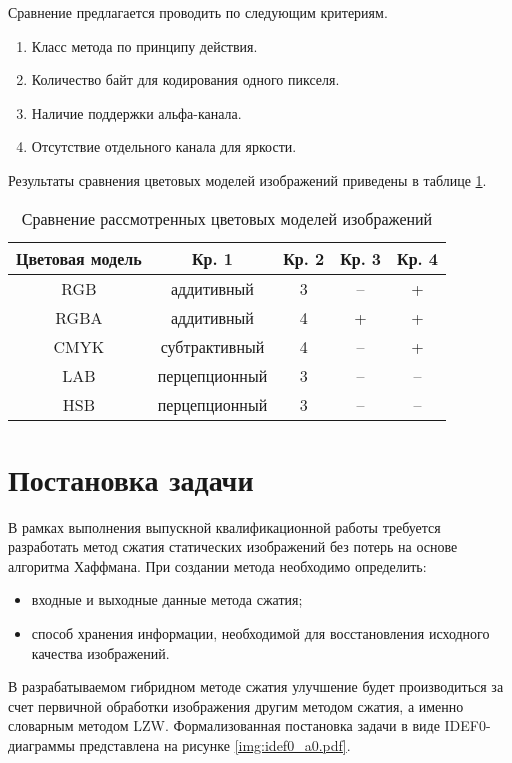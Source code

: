 Сравнение предлагается проводить по следующим критериям.
\begin{enumerate}
    \item Класс метода по принципу действия.
    \item Количество байт для кодирования одного пикселя.
    \item Наличие поддержки альфа-канала.
    \item Отсутствие отдельного канала для яркости.
\end{enumerate}

Результаты сравнения цветовых моделей изображений приведены в таблице \ref{tbl:color_models}.
\captionsetup{justification=raggedleft,singlelinecheck=false}
\begin{table}[H]
    \centering
	\caption{Сравнение рассмотренных цветовых моделей изображений}
    \label{tbl:color_models}
	\begin{tabular}{|c|c|c|c|c|}
        \hline
        \textbf{Цветовая модель} & \textbf{Кр. 1} & \textbf{Кр. 2} & \textbf{Кр. 3} & \textbf{Кр. 4} \\ \hline
        RGB   & аддитивный    & 3 & -- & +  \\ \hline
        RGBA  & аддитивный    & 4 & +  & +  \\ \hline
        CMYK  & субтрактивный & 4 & -- & +  \\ \hline
        LAB   & перцепционный & 3 & -- & -- \\ \hline
        HSB   & перцепционный & 3 & -- & -- \\ \hline
    \end{tabular}
\end{table}

\section{Постановка задачи}

В рамках выполнения выпускной квалификационной работы требуется разработать метод сжатия статических изображений без потерь на основе алгоритма Хаффмана. При создании метода необходимо определить:
\begin{itemize}
    \item входные и выходные данные метода сжатия;
    \item способ хранения информации, необходимой для восстановления исходного качества изображений.
\end{itemize}

В разрабатываемом гибридном методе сжатия улучшение будет производиться за счет первичной обработки изображения другим методом сжатия, а именно словарным методом LZW. Формализованная постановка задачи в виде IDEF0-диаграммы представлена на рисунке \ref{img:idef0_a0.pdf}.

